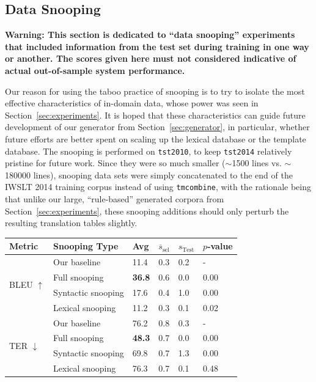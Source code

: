 {\subsection{Data Snooping}
\textbf{
Warning: This section is dedicated to ``data snooping'' experiments that included information from the test set during training in one way or another.
The scores given here must not considered indicative of actual out-of-sample system performance.
}

Our reason for using the taboo practice of snooping is to try to isolate the most effective characteristics of in-domain data, whose power was seen in Section~\ref{sec:experiments}.
It is hoped that these characteristics can guide future development of our generator from Section~\ref{sec:generator}, in particular, whether future efforts are better spent on scaling up the lexical database or the template database.
The snooping is performed on {\small \tt tst2010}, to keep {\small \tt tst2014} relatively pristine for future work.
Since they were so much smaller ($\sim$1500 lines vs. $\sim$180000 lines), snooping data sets were simply concatenated to the end of the IWSLT 2014 training corpus instead of using {\small \tt tmcombine}, with the rationale being that unlike our large, ``rule-based'' generated corpora from Section~\ref{sec:experiments}, these snooping additions should only perturb the resulting translation tables slightly.



\begin{table}[htb]
\begin{center}
\begin{tabular}{|l|l|l|l|l|l|}
\hline
\bf Metric & \bf Snooping Type & \bf Avg & \bf $\overline{s}_{\text{sel}}$ & \bf $s_{\text{Test}}$ & \bf $p$-value \\
\hline
\multirow{4}{*}{BLEU $\uparrow$}
& Our baseline & 11.4 & 0.3 & 0.2 & - \\
& Full snooping & \textbf{36.8} & 0.6 & 0.0 & 0.00 \\
& Syntactic snooping & 17.6 & 0.4 & 1.0 & 0.00 \\
& Lexical snooping & 11.2 & 0.3 & 0.1 & 0.02 \\
\hline
\multirow{4}{*}{TER $\downarrow$}
& Our baseline & 76.2 & 0.8 & 0.3 & - \\
& Full snooping & \textbf{48.3} & 0.7 & 0.0 & 0.00 \\
& Syntactic snooping & 69.8 & 0.7 & 1.3 & 0.00 \\
& Lexical snooping & 76.3 & 0.7 & 0.1 & 0.48 \\
\hline
\end{tabular}
\end{center}


\end{table}}
